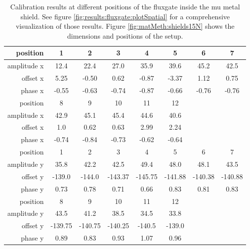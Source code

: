         \begin{table}
            \centering
            \begin{tabular}{|r|ccccccc|}
                \hline
                position & 1& 2 & 3 & 4 & 5 & 6 & 7 \\
                \hline 
                amplitude x& 12.4 & 22.4 & 27.0 & 35.9 & 39.6 & 45.2 & 42.5\\
                offset x&    5.25 & -0.50 & 0.62 & -0.87 & -3.37 & 1.12 & 0.75 \\
                phase x&    -0.55 & -0.63 & -0.74 & -0.87 & -0.66 & -0.76 & -0.76 \\

                \hline
                position & 8 & 9 & 10 & 11 & 12 &&\\
                \hline
                amplitude x & 42.9 & 45.1 & 45.4 & 44.6 & 40.6 && \\
                offset x & 1.0 &  0.62 & 0.63 & 2.99 & 2.24 && \\
                phase x & -0.74 & -0.84 & -0.73 & -0.62 & -0.64&&  \\
                \hline
                position & 1& 2 & 3 & 4 & 5 & 6 & 7\\
                \hline
                amplitude y & 35.8 & 42.2 & 42.5 & 49.4 & 48.0 & 48.1 & 43.5 \\
                offset y & -139.0 & -144.0 & -143.37 & -145.75 & -141.88 & -140.38 & -140.88 \\
                phase y & 0.73 & 0.78 & 0.71 & 0.66 & 0.83 & 0.81 & 0.83 \\
                \hline
                position &  8 & 9 & 10 & 11 & 12&&\\
                \hline
                amplitude y & 43.5 & 41.2 & 38.5 & 34.5 & 33.8 &&\\
                offset y & -139.75 & -140.75 & -140.25 & -140.5 & -139.0 &&\\
                phase y & 0.89 & 0.83 & 0.93 & 1.07 & 0.96 && \\
                \hline
            \end{tabular}
            \caption[Fluxgate calibration results]{Calibration results at different positions of the fluxgate inside the mu metal shield. See figure \ref{fig:results:fluxgate:plotSpatial} for a comprehensive visualization of those results. Figure \ref{fig:matMeth:shields15N} shows the dimensions and positions of the setup.}
            \label{table:results:calibrationFitParams}
        \end{table}

